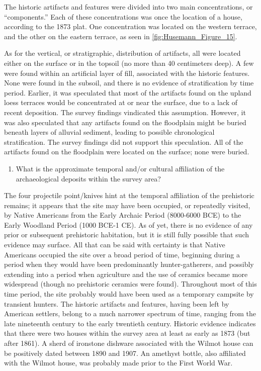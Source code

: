 The historic artifacts and features were divided into two main concentrations, or “components.” Each of these concentrations was once the location of a house, according to the 1873 plat. One concentration was located on the western terrace, and the other on the eastern terrace, as seen in \cref{fig:Husemann_Figure_15}.

As for the vertical, or stratigraphic, distribution of artifacts, all were located either on the surface or in the topsoil (no more than 40 centimeters deep). A few were found within an artificial layer of fill, associated with the historic features. None were found in the subsoil, and there is no evidence of stratification by time period. Earlier, it was speculated that most of the artifacts found on the upland loess terraces would be concentrated at or near the surface, due to a lack of recent deposition. The survey findings vindicated this assumption. However, it was also speculated that any artifacts found on the floodplain might be buried beneath layers of alluvial sediment, leading to possible chronological stratification. The survey findings did not support this speculation. All of the artifacts found on the floodplain were located on the surface; none were buried.

\begin{enumerate}[resume]
	\item What is the approximate temporal and/or cultural affiliation of the archaeological deposits within the survey area?
\end{enumerate}

The four projectile point/knives hint at the temporal affiliation of the prehistoric remains; it appears that the site may have been occupied, or repeatedly visited, by Native Americans from the Early Archaic Period (8000-6000 BCE) to the Early Woodland Period (1000 BCE-1 CE). As of yet, there is no evidence of any prior or subsequent prehistoric habitation, but it is still fully possible that such evidence may surface. All that can be said with certainty is that Native Americans occupied the site over a broad period of time, beginning during a period when they would have been predominantly hunter-gatherers, and possibly extending into a period when agriculture and the use of ceramics became more widespread (though no prehistoric ceramics were found). Throughout most of this time period, the site probably would have been used as a temporary campsite by transient hunters.
The historic artifacts and features, having been left by American settlers, belong to a much narrower spectrum of time, ranging from the late nineteenth century to the early twentieth century. Historic evidence indicates that there were two houses within the survey area at least as early as 1873 (but after 1861). A sherd of ironstone dishware associated with the Wilmot house can be positively dated between 1890 and 1907. An amethyst bottle, also affiliated with the Wilmot house, was probably made prior to the First World War.

